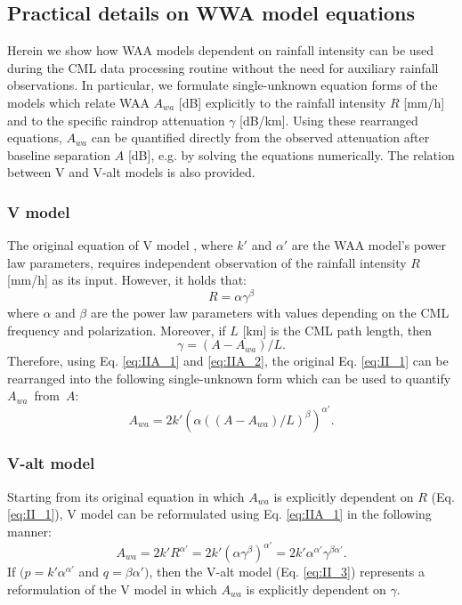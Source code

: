 \documentclass{ctuthesis}\usepackage[]{graphicx}\usepackage[]{color}
\begin{document}
\subsection{Practical details on WWA model equations} \label{paperIIfromAppend}

Herein we show how WAA models dependent on rainfall intensity can be used during the CML data processing routine without the need for auxiliary rainfall observations. In particular, we formulate single-unknown equation forms of the models which relate WAA $A_{wa}$ [dB] explicitly to the rainfall intensity $R$ [mm/h] and to the specific raindrop attenuation $\gamma$ [dB/km]. Using these rearranged equations, $A_{wa}$ can be quantified directly from the observed attenuation after baseline separation $A$ [dB], e.g. by solving the equations numerically. The relation between V and V-alt models is also provided.


\subsubsection{V model}
The original equation of V model \citep[Eq. \ref{eq:II_1};][]{valtrExcessAttenuationCaused2019}, where $k'$ and $\alpha'$ are the WAA model’s power law parameters, requires independent observation of the rainfall intensity $R$ [mm/h] as its input. However, it holds that:
\begin{equation} \label{eq:IIA_1}
        R = \alpha \gamma^{\beta}
\end{equation}
where $\alpha$ and $\beta$ are the power law parameters with values depending on the CML frequency and polarization. Moreover, if $L$ [km] is the CML path length, then 
\begin{equation} \label{eq:IIA_2}
        \gamma = (A - A_{wa})  / L.
\end{equation}
Therefore, using Eq. \ref{eq:IIA_1} and \ref{eq:IIA_2}, the original Eq. \ref{eq:II_1} can be rearranged into the following single-unknown form which can be used to quantify $A_{wa}$~from~$A$:
\begin{equation} \label{eq:IIA_3}
        A_{wa} = 2 k' (\alpha ((A - A_{wa}) / L) ^\beta )^{\alpha'}.
\end{equation}


\subsubsection{V-alt model}
Starting from its original equation in which $A_{wa}$ is explicitly dependent on $R$ (Eq. \ref{eq:II_1}), V model can be reformulated using Eq. \ref{eq:IIA_1} in the following manner:
\begin{equation} \label{eq:IIA_4}
        A_{wa} = 2 k' R^{\alpha'} = 2 k' (\alpha \gamma ^\beta )^{\alpha'} = 2 k' \alpha ^{\alpha'}  \gamma^{\beta \alpha'}.
\end{equation}
If  $ (p = k' \alpha^{\alpha'} $  and  $ q = \beta \alpha' ) $, then the V-alt model (Eq. \ref{eq:II_3}) represents a reformulation of the V model in which $A_{wa}$ is explicitly dependent on $\gamma$.
\end{document}
